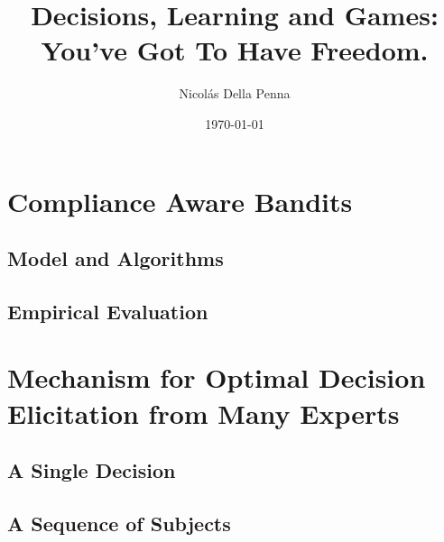 \documentclass[11pt, a4paper]{book}
\title{Decisions, Learning and Games: \\ You've Got To Have Freedom.}
\author{Nicol\'as Della Penna}
\date{\today}
\begin{document}
\pagestyle{empty}
\thispagestyle{empty}



\cleardoublepage
\pagestyle{empty}


\cleardoublepage
\pagestyle{empty}


\cleardoublepage
\pagestyle{headings}


\cleardoublepage
\pagestyle{headings}
\tableofcontents
\listoffigures
\listoftables

\mainmatter




\part{Compliance Aware Bandits}

\chapter{Model and Algorithms}





\chapter{Empirical Evaluation}



\part{Mechanism for Optimal Decision Elicitation from Many Experts}

\chapter{A Single Decision}
\label{cha:market}


\chapter{A Sequence of Subjects}

\end{document}
